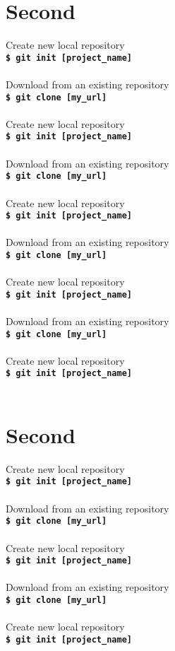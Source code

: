 \documentclass[a3paper,margin=4pt,landscape]{article}
\newcommand{\cmd}[2]{
	#1\\
	\texttt{\textbf{\$ git #2}}\\
	\\
}
\begin{document}
\begin{multicols}{4}
\section*{Second}

\cmd{Create new local repository}{init [project\_name]}
\cmd{Download from an existing repository}{clone [my\_url]}
\cmd{Create new local repository}{init [project\_name]}
\cmd{Download from an existing repository}{clone [my\_url]}
\cmd{Create new local repository}{init [project\_name]}
\cmd{Download from an existing repository}{clone [my\_url]}
\cmd{Create new local repository}{init [project\_name]}
\cmd{Download from an existing repository}{clone [my\_url]}
\cmd{Create new local repository}{init [project\_name]}



\section*{Second}

\cmd{Create new local repository}{init [project\_name]}
\cmd{Download from an existing repository}{clone [my\_url]}
\cmd{Create new local repository}{init [project\_name]}
\cmd{Download from an existing repository}{clone [my\_url]}
\cmd{Create new local repository}{init [project\_name]}



\end{multicols}
\end{document}
